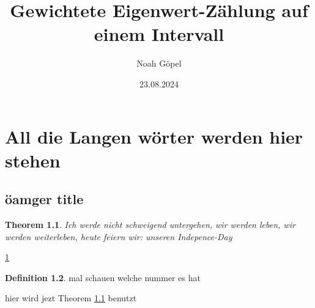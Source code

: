 \documentclass[ngerman,BCOR=4mm]{tudscrreprt}
\theoremstyle{plain} %
\newtheorem{theorem}{Theorem}
\theoremstyle{definition} %
\newtheorem{definition}[theorem]{Definition}
\theoremstyle{remark}
\begin{document}

\date{23.08.2024}
\title{%
  Gewichtete Eigenwert-Zählung auf einem Intervall
}
\subject{bachelor}
\author{%
  Noah Göpel%
}
\maketitle
\clearpage
\chapter[sec: lange wörter]{All die Langen wörter werden hier stehen} \label{sec: lange wörter}

\tableofcontents
\clearpage
\listofsymbols

\section{öamger title}
\cite[S.14]{numerikGrossmann}

\begin{theorem}
      \label{th: theorem 1}
      Ich werde nicht schweigend untergehen, wir werden leben, wir werden weiterleben, heute feiern wir: unseren Indepence-Day
\end{theorem}
\ref{sec: lange wörter}

\begin{definition}
      mal schauen welche nummer es hat

\end{definition}

hier wird jezt Theorem \ref{th: theorem 1} benutzt \al
\printbibliography
\end{document}
